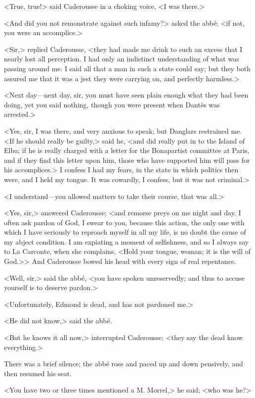  <True, true!> said Caderousse in a choking voice, <I was there.> 

 <And did you not remonstrate against such infamy?> asked the abbé; <if not, you were an accomplice.> 

 <Sir,> replied Caderousse, <they had made me drink to such an excess that I nearly lost all perception. I had only an indistinct understanding of what was passing around me. I said all that a man in such a state could say; but they both assured me that it was a jest they were carrying on, and perfectly harmless.> 

 <Next day—next day, sir, you must have seen plain enough what they had been doing, yet you said nothing, though you were present when Dantès was arrested.> 

 <Yes, sir, I was there, and very anxious to speak; but Danglars restrained me. <If he should really be guilty,> said he, <and did really put in to the Island of Elba; if he is really charged with a letter for the Bonapartist committee at Paris, and if they find this letter upon him, those who have supported him will pass for his accomplices.> I confess I had my fears, in the state in which politics then were, and I held my tongue. It was cowardly, I confess, but it was not criminal.>

<I understand—you allowed matters to take their course, that was all.> 

 <Yes, sir,> answered Caderousse; <and remorse preys on me night and day. I often ask pardon of God, I swear to you, because this action, the only one with which I have seriously to reproach myself in all my life, is no doubt the cause of my abject condition. I am expiating a moment of selfishness, and so I always say to La Carconte, when she complains, <Hold your tongue, woman; it is the will of God.>> And Caderousse bowed his head with every sign of real repentance. 

 <Well, sir,> said the abbé, <you have spoken unreservedly; and thus to accuse yourself is to deserve pardon.> 

 <Unfortunately, Edmond is dead, and has not pardoned me.> 

 <He did not know,> said the abbé. 

 <But he knows it all now,> interrupted Caderousse; <they say the dead know everything.> 

 There was a brief silence; the abbé rose and paced up and down pensively, and then resumed his seat. 

 <You have two or three times mentioned a M. Morrel,> he said; <who was he?> 

